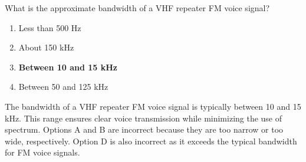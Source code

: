 \begin{tcolorbox}[colback=gray!10!white,colframe=black!75!black,title={T8A09}]
    What is the approximate bandwidth of a VHF repeater FM voice signal?
    \begin{enumerate}[label=\Alph*),noitemsep]
        \item Less than 500 Hz
        \item About 150 kHz
        \item \textbf{Between 10 and 15 kHz}
        \item Between 50 and 125 kHz
    \end{enumerate}
\end{tcolorbox}
The bandwidth of a VHF repeater FM voice signal is typically between 10 and 15 kHz. This range ensures clear voice transmission while minimizing the use of spectrum. Options A and B are incorrect because they are too narrow or too wide, respectively. Option D is also incorrect as it exceeds the typical bandwidth for FM voice signals.

